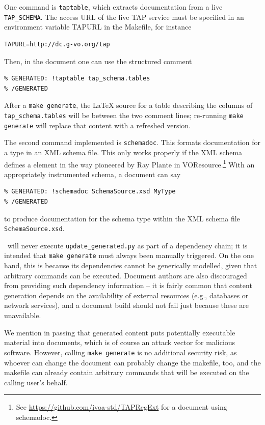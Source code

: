 \documentclass[11pt,a4paper]{ivoa}
\begin{document}
One command is \texttt{taptable}, which extracts documentation from a
live \texttt{TAP\_SCHEMA}.  The access URL of the
live TAP service must be specified in an environment variable TAPURL in
the Makefile, for instance

\begin{lstlisting}
TAPURL=http://dc.g-vo.org/tap
\end{lstlisting}

Then, in the document one can use the structured comment

\begin{lstlisting}
% GENERATED: !taptable tap_schema.tables
% /GENERATED
\end{lstlisting}

After a \texttt{make generate}, the LaTeX source for a table describing
the columns of \texttt{tap\_schema.tables} will be between the two
comment lines; re-running \texttt{make generate} will replace that
content with a refreshed version.

The second command implemented is \texttt{schemadoc}. This formats
documentation for a type in an XML schema file.  This only works
properly if the XML schema defines a  element in
the way pioneered by Ray Plante in
VOResource.\footnote{See
\url{https://github.com/ivoa-std/TAPRegExt} for a document using
schemadoc.}
With an appropriately instrumented schema, a document can say

\begin{lstlisting}
% GENERATED: !schemadoc SchemaSource.xsd MyType
% /GENERATED
\end{lstlisting}

to produce documentation for the schema type  within
the XML schema file \texttt{SchemaSource.xsd}.

\ivoatex~will never execute \texttt{update\_generated.py} as part of a
dependency chain; it is intended that \texttt{make generate} must always
been manually triggered.  On the one hand, this is because its
dependencies cannot be generically modelled, given that arbitrary
commands can be executed.  Document authors are also discouraged from
providing such dependency information -- it is fairly common that
content generation depends on the availability of external resources
(e.g., databases or network services), and a document build should not
fail just because these are unavailable.

We mention in passing that generated content puts potentially executable
material into documents, which is of course an attack vector for
malicious software.  However, calling \texttt{make generate} is no
additional security risk, as whoever can change the document can
probably change the makefile, too, and the makefile can already contain
arbitrary commands that will be executed on the calling user's behalf.
\end{document}
